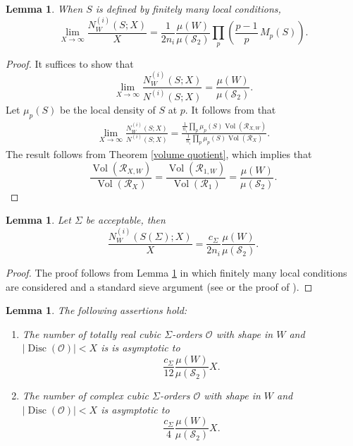 \documentclass[table]{amsart}
\newtheorem{lemma}[theorem]{Lemma}
\newcommand{\op}[1]{\operatorname{#1}}
\numberwithin{equation}{section}
\begin{document}
\begin{lemma}\label{finitely many conditions}
   When $S$ is defined by finitely many local conditions, \[
\lim_{X\to\infty} \frac{N^{(i)}_W(S;X)}{X}
=
\frac{1}{2n_i}\frac{\mu(W)}{\mu(\mathcal{S}_2)}
\prod_p \left(\frac{p-1}{p}\, M_p(S)\right).
\]
\end{lemma}
\begin{proof}
    It suffices to show that 
    \[\lim_{X\rightarrow \infty} \frac{N^{(i)}_W(S;X)}{N^{(i)}(S;X)}=\frac{\mu(W)}{\mu(\mathcal{S}_2)}.\]
    Let $\mu_p(S)$ be the local density of $S$ at $p$. It follows from \cite[Lemma 9]{bhargavaharron} that
    \[\begin{split}
        \lim_{X\rightarrow \infty} \frac{N^{(i)}_W(S;X)}{N^{(i)}(S;X)}=\frac{\frac{1}{n_i}\prod_p \mu_p(S)\op{Vol}(\mathcal{R}_{X,W})}{\frac{1}{n_i}\prod_p \mu_p(S)\op{Vol}(\mathcal{R}_{X})}.
    \end{split}\]
    The result follows from Theorem \ref{volume quotient}, which implies that
    \[\frac{\op{Vol}(\mathcal{R}_{X,W})}{\op{Vol}(\mathcal{R}_{X})}=\frac{\op{Vol}(\mathcal{R}_{1,W})}{\op{Vol}(\mathcal{R}_{1})}=\frac{\mu(W)}{\mu(\mathcal{S}_2)}.\]
\end{proof}

\begin{lemma}\label{main lemma 1}
    Let $\Sigma$ be acceptable, then
    \[\frac{N^{(i)}_W(S(\Sigma);X)}{X}=\frac{c_\Sigma}{2n_i}\frac{\mu(W)}{\mu(\mathcal{S}_2)}.\]
\end{lemma}
\begin{proof}
    The proof follows from Lemma \ref{finitely many conditions} in which finitely many local conditions are considered and a standard sieve argument (see \cite[section 5]{bhargavaharron} or the proof of \cite[(12)]{BhargavaVarma}).  
\end{proof}

\begin{lemma}\label{main lemma 2}
The following assertions hold:
\begin{enumerate}
\item
The number of totally real cubic \(\Sigma\)-orders \(\mathcal{O}\) with shape in $W$ and
\(\lvert\op{Disc}(\mathcal{O})\rvert<X\) is is asymptotic to
\[
\frac{c_\Sigma}{12}\frac{\mu(W)}{\mu(\mathcal{S}_2)}X.
\]
\item
The number of complex cubic \(\Sigma\)-orders \(\mathcal{O}\) with shape in $W$ and
\(\lvert\op{Disc}(\mathcal{O})\rvert<X\) is asymptotic to
\[
\frac{c_\Sigma}{4}\frac{\mu(W)}{\mu(\mathcal{S}_2)} X.
\]
\end{enumerate}
\end{lemma}
\end{document}
